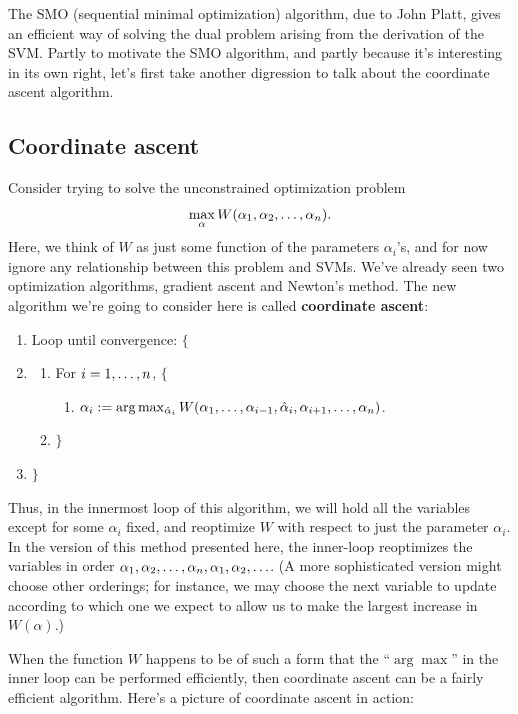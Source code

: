 \documentclass{article}
\begin{document}
The SMO (sequential minimal optimization) algorithm, due to John Platt, gives an efficient
way of solving the dual problem arising from the derivation of the SVM.  Partly to motivate
the SMO algorithm, and partly because it's interesting in its own right, let's first take
another digression to talk about the coordinate ascent algorithm.

\subsection{Coordinate ascent}

Consider trying to solve the unconstrained optimization problem
\[
\max_\alpha W(\alpha_1, \alpha_2, \ldots, \alpha_{{n}}).
\]
Here, we think of $W$ as just some function of the parameters $\alpha_i$'s,
and for now ignore any relationship between this problem and SVMs.
We've already seen two optimization algorithms, gradient ascent and Newton's method.
The new algorithm we're going to consider here is called {\bf coordinate ascent}:
\begin{enumerate}
\item[] Loop until convergence: $\{$
\item[] \begin{enumerate}
        \item[] For $i=1,\ldots,{n}$, $\{$
\begin{enumerate} \item[] $\alpha_i := \arg \max_{\hat\alpha_i}
         W(\alpha_1, \ldots, \alpha_{i-1}, \hat\alpha_i, \alpha_{i+1}, \ldots, \alpha_{{n}})$.
\end{enumerate}
\item[] $\}$
\end{enumerate}
\item[] $\}$
\end{enumerate}

Thus, in the innermost loop of this algorithm, we will hold all the variables except
for some $\alpha_i$ fixed, and reoptimize $W$ with respect to just the parameter $\alpha_i$.
In the version of this method presented here, the inner-loop reoptimizes the
variables in order $\alpha_1, \alpha_2, \ldots, \alpha_{{n}}, \alpha_1, \alpha_2, \ldots$.
(A more sophisticated version might choose other orderings; for instance, we may
choose the next variable to update according to which one we expect to allow us to
make the largest
increase in $W(\alpha)$.)

When the function $W$ happens to be of such a form that the ``$\arg \max$''
in the inner loop can be performed efficiently, then coordinate ascent can be a fairly
efficient algorithm.  Here's a picture of coordinate ascent in action:
\end{document}
